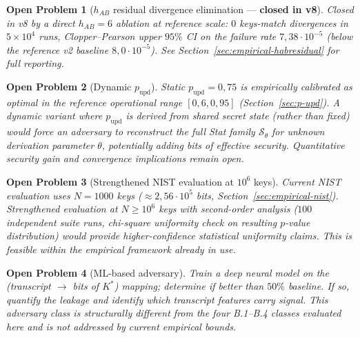 \documentclass[11pt,a4paper]{article}
\newtheorem{openproblem}{Open Problem}
\begin{document}
\begin{openproblem}[$h_{AB}$ residual divergence elimination — \textbf{closed in v8}]\label{prob:hab-residual}
Closed in v8 by a direct $h_{AB} = 6$ ablation at reference scale: $0$ keys-match divergences in $5 \times 10^4$ runs, Clopper--Pearson upper $95\%$ CI on the failure rate $7{,}38 \cdot 10^{-5}$ (below the reference v2 baseline $8{,}0 \cdot 10^{-5}$). See Section~\ref{sec:empirical-habresidual} for full reporting.
\end{openproblem}

\begin{openproblem}[Dynamic $p_\text{upd}$]\label{prob:pupd-dynamic}
Static $p_\text{upd} = 0{,}75$ is empirically calibrated as optimal in the reference operational range $[0{,}6, 0{,}95]$ (Section~\ref{sec:p-upd}). A dynamic variant where $p_\text{upd}$ is derived from shared secret state (rather than fixed) would force an adversary to reconstruct the full Stat family $\mathcal{S}_\theta$ for unknown derivation parameter $\theta$, potentially adding bits of effective security. Quantitative security gain and convergence implications remain open.
\end{openproblem}

\begin{openproblem}[Strengthened NIST evaluation at $10^6$ keys]\label{prob:nist-strong}
Current NIST evaluation uses $N = 1000$ keys ($\approx 2{,}56 \cdot 10^5$ bits, Section~\ref{sec:empirical-nist}). Strengthened evaluation at $N \geq 10^6$ keys with second-order analysis ($100$ independent suite runs, chi-square uniformity check on resulting $p$-value distribution) would provide higher-confidence statistical uniformity claims. This is feasible within the empirical framework already in use.
\end{openproblem}

\begin{openproblem}[ML-based adversary]\label{prob:ml}
Train a deep neural model on the (transcript $\to$ bits of $K^*$) mapping; determine if better than $50\%$ baseline. If so, quantify the leakage and identify which transcript features carry signal. This adversary class is structurally different from the four B.1--B.4 classes evaluated here and is not addressed by current empirical bounds.
\end{openproblem}
\end{document}
